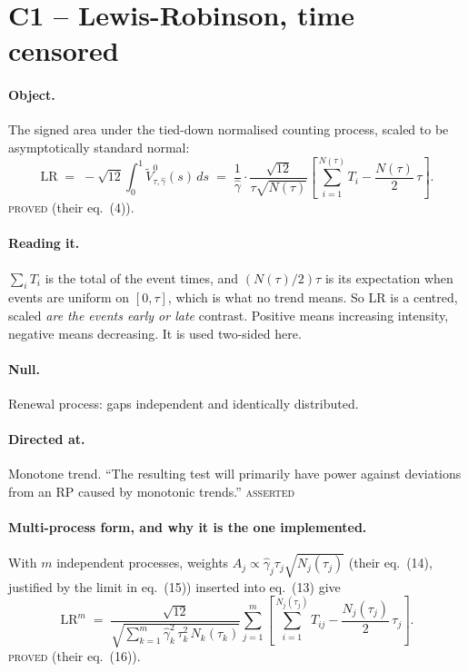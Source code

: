 \documentclass[11pt,a4paper]{article}
\newcommand{\Vtilde}{\widetilde{V}^{0}_{\tau,\hat\gamma}}
\newcommand{\gh}{\hat\gamma}
\newcommand{\Ntau}{N(\tau)}
\newcommand{\PROVED}{\textsc{\textcolor{blue!55!black}{proved}}}
\newcommand{\ASSERTED}{\textsc{\textcolor{purple!70!black}{asserted}}}
\begin{document}
\section{C1 -- Lewis-Robinson, time censored}

\paragraph{Object.} The signed area under the tied-down normalised counting process,
scaled to be asymptotically standard normal:
%
\begin{equation}
\mathrm{LR} \;=\; -\sqrt{12}\int_0^1 \Vtilde(s)\,ds
\;=\; \frac{1}{\gh}\cdot\frac{\sqrt{12}}{\tau\sqrt{\Ntau}}
\left[\sum_{i=1}^{\Ntau} T_i - \frac{\Ntau}{2}\,\tau\right].
\label{eq:lr}
\end{equation}
\PROVED{} (their eq.~(4)).

\paragraph{Reading it.} $\sum_i T_i$ is the total of the event times, and
$(\Ntau/2)\tau$ is its expectation when events are uniform on $[0,\tau]$, which is what
no trend means. So LR is a centred, scaled \emph{are the events early or late}
contrast. Positive means increasing intensity, negative means decreasing. It is used
two-sided here.

\paragraph{Null.} Renewal process: gaps independent and identically distributed.

\paragraph{Directed at.} Monotone trend. \enquote{The resulting test will primarily have
power against deviations from an RP caused by monotonic trends.} \ASSERTED

\paragraph{Multi-process form, and why it is the one implemented.} With $m$ independent
processes, weights $A_j \propto \gh_j \tau_j \sqrt{N_j(\tau_j)}$ (their eq.~(14),
justified by the limit in eq.~(15)) inserted into eq.~(13) give
%
\begin{equation}
\mathrm{LR}^m \;=\;
\frac{\sqrt{12}}{\sqrt{\sum_{k=1}^{m}\gh_k^2\,\tau_k^2\,N_k(\tau_k)}}
\sum_{j=1}^{m}\left[\sum_{i=1}^{N_j(\tau_j)} T_{ij} - \frac{N_j(\tau_j)}{2}\,\tau_j\right].
\label{eq:lrm}
\end{equation}
\PROVED{} (their eq.~(16)).
\end{document}
